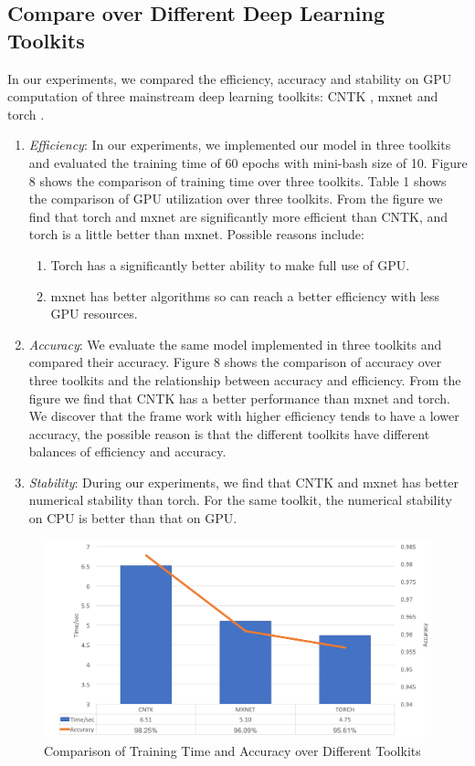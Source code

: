 \documentclass[a4paper, 11pt]{article} %
\begin{document}
\subsection{Compare over Different Deep Learning Toolkits}
In our experiments, we compared the efficiency, accuracy and stability on GPU computation of three mainstream deep learning toolkits: CNTK\cite{dallycntk} , mxnet\cite{chen2015mxnet} and torch\cite{collobert2011torch7} . 
\begin{enumerate}
	\item \textit{Efficiency}: In our experiments, we implemented our model in three toolkits and evaluated the training time of 60 epochs with mini-bash size of 10. Figure 8 shows the comparison of training time over three toolkits. Table 1 shows the comparison of GPU utilization over three toolkits. From the figure we find that torch and mxnet are significantly more efficient than CNTK, and torch is a little better than mxnet. Possible reasons include:
	\begin{enumerate}
		\item Torch has a significantly better ability to make full use of GPU.
		\item mxnet has better algorithms so can reach a better efficiency with less GPU resources.
	\end{enumerate}
	\item \textit{Accuracy}: We evaluate the same model implemented in three toolkits and compared their accuracy. Figure 8 shows the comparison of accuracy over three toolkits and the relationship between accuracy and efficiency. From the figure we find that CNTK has a better performance than mxnet and torch. We discover that the frame work with higher efficiency tends to have a lower accuracy, the possible reason is that the different toolkits have different balances of efficiency and accuracy.
	\item \textit{Stability}: During our experiments, we find that CNTK and mxnet has better numerical stability than torch. For the same toolkit, the numerical stability on CPU is better than that on GPU.
\end{enumerate}

\begin{figure}[H]
\centerline{\includegraphics[width=\linewidth ]{figure/acc-time}}
\caption{Comparison of Training Time and Accuracy over Different Toolkits}
\label{fig_f0fit}
\end{figure}
\end{document}
